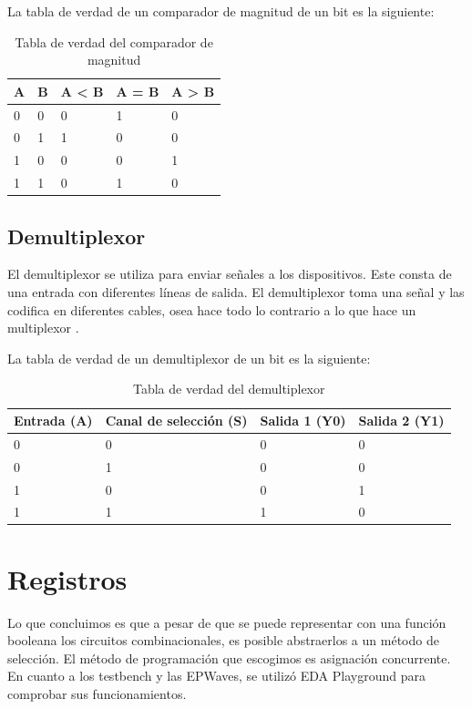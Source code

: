 \documentclass[12pt]{article}  %
\begin{document}
La tabla de verdad de un comparador de magnitud de un bit es la siguiente:
\begin{table}[!ht]
	\centering
        \caption {Tabla de verdad del comparador de magnitud}
	\begin{tabular}{|l|l|l|l|l|}
	\hline
	    A	&  B  & A < B  & A = B  & A > B  \\\hline 
         0  &  0  &  0  &  1  &  0 \\ \hline 
         0  &  1  &  1  &  0  &  0 \\  \hline 
         1  &  0  &  0  &  0  &  1 \\ \hline 
         1  &  1  &  0  &  1  &  0 \\ \hline
 \end{tabular}
 \end{table}
 
\subsection*{Demultiplexor}

El demultiplexor se utiliza para enviar señales a los dispositivos. Este consta de una entrada con diferentes líneas de salida. El demultiplexor toma una señal y las codifica en diferentes cables, osea hace todo lo contrario a lo que hace un multiplexor \cite{Electricidad}.

La tabla de verdad de un demultiplexor de un bit es la siguiente:

\begin{table}[!ht]
	\centering
	\begin{tabular}{|l|l|l|l|}
\hline Entrada (A) & Canal de selección (S) & Salida 1 (Y0) & Salida 2 (Y1)  \\
\hline 0 & 0 & 0 & 0 \\ 
\hline 0 & 1 & 0 & 0 \\ 
\hline 1 & 0 & 0 & 1 \\ 
\hline 1  &  1  & 1 & 0 \\  

   \hline
	\end{tabular}
	\caption {Tabla de verdad del demultiplexor}
	\label{Tabla:1}
 \end{table}
 
\section*{Registros}
Lo que concluimos es que a pesar de que se puede representar con una función booleana los circuitos combinacionales, es posible abstraerlos a un método de selección. El método de programación que escogimos es asignación concurrente. En cuanto a los testbench y las EPWaves, se utilizó EDA Playground para comprobar sus funcionamientos.
\end{document}
